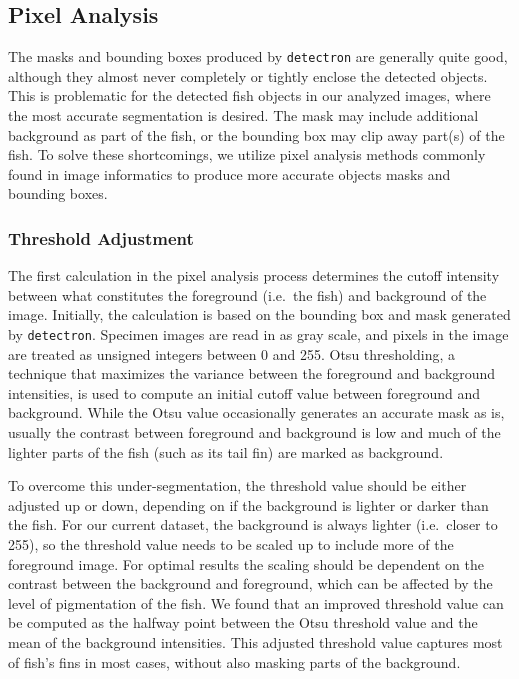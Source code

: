 \documentclass[conference]{IEEEtran}
\begin{document}
\subsection{Pixel Analysis}
The masks and bounding boxes produced by \verb|detectron| are generally quite good, although they almost never completely or tightly enclose the
detected objects.
This is problematic for the detected fish objects in our analyzed images,
where the most accurate segmentation is desired.
The mask may include additional background as part of the fish, or the
bounding box may clip away part(s) of the fish. To solve these
shortcomings, we utilize pixel analysis methods commonly found in image
informatics to produce more accurate objects masks and bounding boxes.

\subsubsection{Threshold Adjustment}
The first calculation in the pixel analysis process determines the cutoff intensity between what constitutes the foreground (i.e.~the fish) and background of the image.
Initially, the calculation is based on the bounding box and mask generated by
\verb|detectron|. Specimen images are read in as gray scale, and pixels in the image are treated as unsigned integers between 0 and 255.
Otsu thresholding, a technique that maximizes the variance between the 
foreground and background intensities, is used to compute an initial cutoff value between foreground and background. 
While the Otsu value occasionally generates an accurate mask as is, usually
the contrast between foreground and background is low and much of the lighter parts of the fish (such as its tail fin) are marked as background.

To overcome this under-segmentation, the threshold value should be
either adjusted up or down, depending on if the background is lighter or darker than the fish.
For our current dataset, the background is always lighter (i.e.~closer to 255), so the threshold value needs to be scaled up to include more of the
foreground image.
For optimal results the scaling should be dependent on the
contrast between the background and foreground,
which can be affected by
the level of pigmentation of the fish.
We found that an improved threshold value can be computed as the halfway
point between the Otsu threshold value and the
mean of the background intensities.
This adjusted threshold value
captures most of fish's fins in most cases, without also masking parts of the background.
\end{document}
